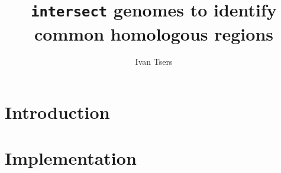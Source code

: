 \documentclass[a4paper]{article}
\begin{document}
\pagestyle{noweb}

\title{\texttt{intersect} genomes to identify common homologous regions}
\author{Ivan Tsers}
\date{}
\maketitle
\tableofcontents

\section{Introduction}

\section{Implementation}

\end{document}
